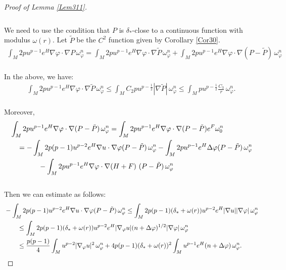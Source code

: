 \documentclass[11pt]{amsart}
\numberwithin{equation}{section}
\begin{document}
\begin{proof}[Proof of Lemma \ref{Lem311}]
\begin{align}
\end{align}\\
We need to use the condition that $P$ is $\delta_*$-close to a continuous function with modulus $\omega(r)$.  Let $\tilde{P}$ be the $C^2$ function given by Corollary \ref{Cor30}.  
\begin{align}
 \int_M 2p u^{p-1} e^{H} \nabla \varphi \cdot \nabla P \, \omega_{\varphi}^n = \int_M 2p u^{p-1} e^{H} \nabla \varphi \cdot \nabla \tilde{P} \, \omega_{\varphi}^n + \int_M 2p u^{p-1} e^{H} \nabla \varphi \cdot \nabla(P - \tilde{P}) \, \omega_{\varphi}^n
\end{align}\\
In the above, we have:
\begin{align}
	\int_M 2p u^{p-1} e^{H} \nabla \varphi \cdot \nabla \tilde{P} \, \omega_{\varphi}^n \le  \int_M C_2 p u^{p - \frac{1}{2}} |\nabla \tilde{P}| \, \omega_{\varphi}^n \le  \int_M p u^{p - \frac{1}{2}} \frac{C_{3}}{r} \, \omega_{\varphi}^n.
\end{align}\\
Moreover,
\begin{align}
	&\int_M 2p u^{p-1} e^{H} \nabla \varphi \cdot \nabla(P - \tilde{P}) \, \omega_{\varphi}^n = \int_M 2p u^{p-1} e^{H} \nabla \varphi \cdot \nabla(P - \tilde{P}) e^F \omega_0^n \notag \\ 
	&\quad = -\int_M 2p(p - 1) u^{p - 2} e^{H} \nabla u \cdot \nabla \varphi (P - \tilde{P}) \, \omega_{\varphi}^n -\int_M 2p u^{p - 1} e^{H} \Delta \varphi (P - \tilde{P}) \, \omega_{\varphi}^n \notag \\ 
	&\quad\quad\qquad -\int_M 2p u^{p - 1} e^{H} \nabla \varphi \cdot \nabla (H+F)\ (P - \tilde{P}) \, \omega_{\varphi}^n
\end{align}\\
Then we can estimate as follows:
\begin{align}
	&-\int_M 2p(p - 1) u^{p - 2} e^{H} \nabla u \cdot \nabla \varphi (P - \tilde{P}) \, \omega_{\varphi}^n \le  \int_M 2p(p - 1)(\delta_* + \omega(r)) u^{p - 2}e^{H} |\nabla u||\nabla \varphi| \, \omega_{\varphi}^n \notag \\
	&\quad\quad \le  \int_M 2p(p - 1)(\delta_* + \omega(r)) u^{p - 2}e^{H} |\nabla_{\varphi} u| (n + \Delta \varphi)^{1/2} |\nabla \varphi| \, \omega_{\varphi}^n \notag \\
	&\quad\quad \le  \frac{p(p - 1)}{4} \int_M u^{p - 2} |\nabla_{\varphi} u|^2 \, \omega_{\varphi}^n + 4 p(p - 1)(\delta_* + \omega(r))^2 \int_M u^{p - 1} e^{H} (n + \Delta \varphi) \, \omega_{\varphi}^n.
\end{align}

\end{proof}
\end{document}
